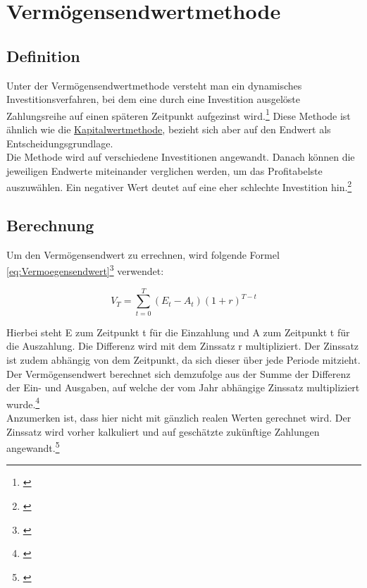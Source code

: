 \chapter{Vermögensendwertmethode}
\label{Vermoegensendwertmethode}

\section{Definition}

Unter der Vermögensendwertmethode versteht man ein dynamisches Investitionsverfahren, bei dem eine durch eine Investition ausgelöste Zahlungsreihe auf einen späteren Zeitpunkt aufgezinst wird.\footnote{\cite{finanzen-vermoegensendwertmethode}} Diese Methode ist ähnlich wie die \hyperref[Kapitalwertmethode]{Kapitalwertmethode}, bezieht sich aber auf den Endwert als Entscheidungsgrundlage.\\
Die Methode wird auf verschiedene Investitionen angewandt. Danach können die jeweiligen Endwerte miteinander verglichen werden, um das Profitabelste auszuwählen. Ein negativer Wert deutet auf eine eher schlechte Investition hin.\footnote{\cite{bwllernen-endwertmethode}}

\section{Berechnung}

Um den Vermögensendwert zu errechnen, wird folgende Formel \eqref{eq:Vermoegensendwert}\footnote{\cite{studyflix-endwertmethode}} verwendet:

\begin{equation}
    V_T = \sum_{ t = 0 }^{ T }{(E_{ t } - A_{ t })(1 + r)^{T - t}}
    \label{eq:Vermoegensendwert}
\end{equation}

\bigskip

\noindent
Hierbei steht E zum Zeitpunkt t für die Einzahlung und A zum Zeitpunkt t für die Auszahlung. Die Differenz wird mit dem Zinssatz r multipliziert. Der Zinssatz ist zudem abhängig von dem Zeitpunkt, da sich dieser über jede Periode mitzieht. Der Vermögensendwert berechnet sich demzufolge aus der Summe der Differenz der Ein- und Ausgaben, auf welche der vom Jahr abhängige Zinssatz multipliziert wurde.\footnote{\cite{studyflix-endwertmethode}}\\

\noindent
Anzumerken ist, dass hier nicht mit gänzlich realen Werten gerechnet wird. Der Zinssatz wird vorher kalkuliert und auf geschätzte zukünftige Zahlungen angewandt.\footnote{\cite{finanzen-vermoegensendwertmethode}}

